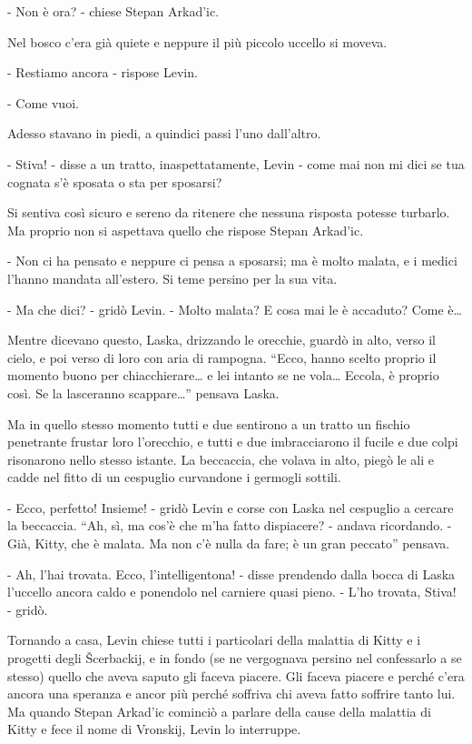 - Non è ora? - chiese Stepan Arkad'ic. 

Nel bosco c'era già quiete e neppure il più piccolo uccello si moveva. 

- Restiamo ancora - rispose Levin. 

- Come vuoi. 

Adesso stavano in piedi, a quindici passi l'uno dall'altro. 

- Stiva! - disse a un tratto, inaspettatamente, Levin - come mai non mi dici se tua cognata s'è sposata o sta per sposarsi? 

Si sentiva così sicuro e sereno da ritenere che nessuna risposta potesse turbarlo. Ma proprio non si aspettava quello che rispose Stepan Arkad'ic. 

- Non ci ha pensato e neppure ci pensa a sposarsi; ma è molto malata, e i medici l'hanno mandata all'estero. Si teme persino per la sua vita. 

- Ma che dici? - gridò Levin. - Molto malata? E cosa mai le è accaduto? Come è\ldots{} 

Mentre dicevano questo, Laska, drizzando le orecchie, guardò in alto, verso il cielo, e poi verso di loro con aria di rampogna. ``Ecco, hanno scelto proprio il momento buono per chiacchierare\ldots{} e lei intanto se ne vola\ldots{} Eccola, è proprio così. Se la lasceranno scappare\ldots{}'' pensava Laska. 

Ma in quello stesso momento tutti e due sentirono a un tratto un fischio penetrante frustar loro l'orecchio, e tutti e due imbracciarono il fucile e due colpi risonarono nello stesso istante. La beccaccia, che volava in alto, piegò le ali e cadde nel fitto di un cespuglio curvandone i germogli sottili. 

- Ecco, perfetto! Insieme! - gridò Levin e corse con Laska nel cespuglio a cercare la beccaccia. ``Ah, sì, ma cos'è che m'ha fatto dispiacere? - andava ricordando. - Già, Kitty, che è malata. Ma non c'è nulla da fare; è un gran peccato'' pensava. 

- Ah, l'hai trovata. Ecco, l'intelligentona! - disse prendendo dalla bocca di Laska l'uccello ancora caldo e ponendolo nel carniere quasi pieno. - L'ho trovata, Stiva! - gridò. 

\label{xvi-1} 

Tornando a casa, Levin chiese tutti i particolari della malattia di Kitty e i progetti degli Šcerbackij, e in fondo (se ne vergognava persino nel confessarlo a se stesso) quello che aveva saputo gli faceva piacere. Gli faceva piacere e perché c'era ancora una speranza e ancor più perché soffriva chi aveva fatto soffrire tanto lui. Ma quando Stepan Arkad'ic cominciò a parlare della cause della malattia di Kitty e fece il nome di Vronskij, Levin lo interruppe. 

